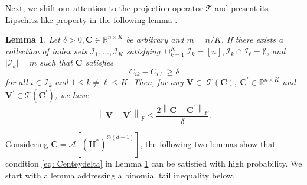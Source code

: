 \documentclass{article}
\theoremstyle{plain}
\newtheorem{lemma}[theorem]{Lemma}
\theoremstyle{definition}
\theoremstyle{remark}
\newcommand{\TCal}{\mathcal{T}}
\newcommand{\ACal}{\mathcal{A}}
\begin{document}
Next, we shift our attention to the projection operator $\TCal$ and present its Lipschitz-like property in the following lemma \citep[Lemma 3]{wang2021optimal}.
\begin{lemma} \label{lemma: lipproj}
	Let $\delta>0, \bm{C} \in \mathbb{R}^{n \times K}$ be arbitrary and $m=n / K$. If there exists a collection of index sets $\mathcal{I}_{1}, \ldots, \mathcal{I}_{K}$ satisfying $\cup_{k=1}^{K} \mathcal{I}_{k}=[n], \mathcal{I}_{k} \cap \mathcal{I}_{\ell}=\emptyset$, and $\left|\mathcal{I}_{k}\right|=m$ such that $\bm{C}$ satisfies
	\begin{equation} \label{eq: Centeydelta}
		C_{i k}-C_{i \ell} \geq \delta
	\end{equation}
	for all $i \in \mathcal{I}_{k}$ and $1 \leq k \neq \ell \leq K$. Then, for any $\bm{V} \in$ $\mathcal{T}(\bm{C}),~ \bm{C}^{\prime} \in \mathbb{R}^{n \times K}$ and $\bm{V}^{\prime} \in \mathcal{T}\left(\bm{C}^{\prime}\right)$, we have
	\begin{equation}	\left\|\bm{V}-\bm{V}^{\prime}\right\|_{F} \leq \frac{2\left\|\bm{C}-\bm{C}^{\prime}\right\|_{F}}{\delta} .
    \end{equation}
\end{lemma}
Considering $\bm{C} = \mathcal{A}\left[(\bm{H}^*)^{\otimes (d-1)}\right]$, the following two lemmas show that condition \eqref{eq: Centeydelta} in Lemma \ref{lemma: lipproj} can be satisfied with high probability. We start with a lemma addressing a binomial tail inequality below.
\end{document}
